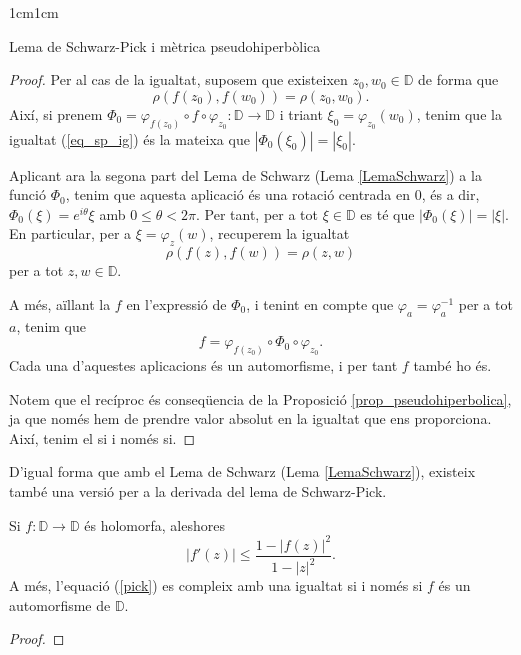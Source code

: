 \begin{adjustwidth}{1cm}{1cm}
\begin{subsection}{Lema de Schwarz-Pick i mètrica pseudohiperbòlica}
\begin{proof}
    Per al cas de la igualtat, suposem que existeixen $z_0,w_0\in \mathbb{D}$ de forma que 
    \begin{equation}
        \rho(f(z_0),f(w_0))=\rho(z_0,w_0).
        \label{eq_sp_ig}
    \end{equation}
    Així, si prenem $\Phi_0=\varphi_{f(z_0)}\circ f\circ \varphi_{z_0}:\mathbb{D}\to \mathbb{D}$ i triant $\xi_0=\varphi_{z_0}(w_0)$, tenim que la igualtat (\ref{eq_sp_ig}) és la mateixa que $|\Phi_0(\xi_0)|=|\xi_0|$.
    
    Aplicant ara la segona part del Lema de Schwarz (Lema \ref{LemaSchwarz}) a la funció $\Phi_0$, tenim que aquesta aplicació és una rotació centrada en $0$, és a dir, $\Phi_0(\xi)=e^{i\theta}\xi$ amb $0\leq\theta<2\pi$. Per tant, per a tot $\xi\in \mathbb{D}$ es té que $|\Phi_0(\xi)|=|\xi|$. En particular, per a $\xi=\varphi_{z}(w)$, recuperem la igualtat
    \[
        \rho(f(z),f(w))=\rho(z,w)
    \]
    per a tot $z,w\in \mathbb{D}$.

    A més, aïllant la $f$ en l'expressió de $\Phi_0$, i tenint en compte que $\varphi_{a}=\varphi^{-1}_{a}$ per a tot $a$, tenim que
    \[
        f=\varphi_{f(z_0)}\circ\Phi_0\circ\varphi_{z_0}.
    \] 
    Cada una d'aquestes aplicacions és un automorfisme, i per tant $f$ també ho és.

    Notem que el recíproc és conseqüencia de la Proposició \ref{prop_pseudohiperbolica}, ja que només hem de prendre valor absolut en la igualtat que ens proporciona. Així, tenim el si i només si.
\end{proof}

D'igual forma que amb el Lema de Schwarz (Lema \ref{LemaSchwarz}), existeix també una versió per a la derivada del lema de Schwarz-Pick.

\begin{lema}
    Si $f:\mathbb{D}\to \mathbb{D}$ és holomorfa, aleshores
    \begin{equation}
        |f'(z)|\leq \frac{1-|f(z)|^2}{1-|z|^2}.
        \label{pick}
    \end{equation}
    A més, l'equació (\ref{pick}) es compleix amb una igualtat si i només si $f$ és un automorfisme de $\mathbb{D}$.
\end{lema}

\begin{proof}


\end{proof}
\end{subsection}
\end{adjustwidth}

